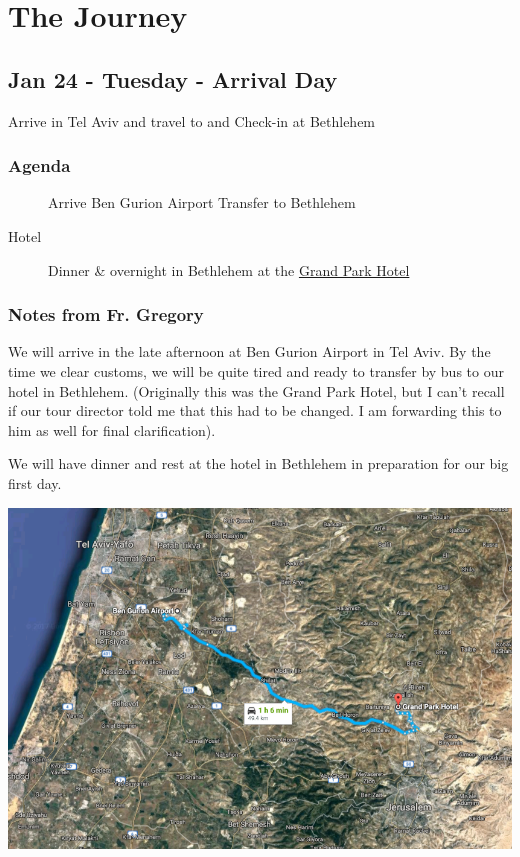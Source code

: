 \documentclass[letterpaper]{report}
\begin{document}
\chapter{The Journey}
\section{Jan 24 - Tuesday - Arrival Day}
Arrive in Tel Aviv and travel to and Check-in at Bethlehem

\subsection{Agenda}
\begin{description}
  \item[] Arrive Ben Gurion Airport Transfer to Bethlehem
  \item[Hotel] Dinner \& overnight in Bethlehem at the
    \href{http://www.grandpark.com/bethlehem/}{Grand Park Hotel}
\end{description}

\subsection{Notes from Fr. Gregory}
We will arrive in the late afternoon at Ben Gurion Airport in Tel Aviv.
By the time we clear customs, we will be quite tired and ready to transfer by bus 
to our hotel in Bethlehem.
(Originally this was the Grand Park Hotel, but I can't recall if our tour 
director told me that this had to be changed.
I am forwarding this to him as well for final clarification).


We will have dinner and rest at the hotel in Bethlehem in preparation for our
big first day.

\includegraphics[width=\textwidth]{AirportToHotel}
\end{document}
